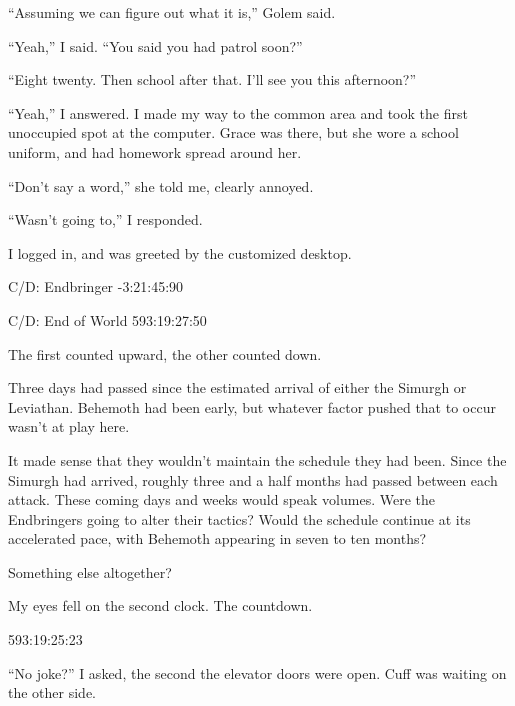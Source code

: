 ``Assuming we can figure out what it is,'' Golem said.



``Yeah,'' I said. ``You said you had patrol soon?''



``Eight twenty.  Then school after that.  I'll see you this afternoon?''



``Yeah,'' I answered.  I made my way to the common area and took the first unoccupied spot at the computer.  Grace was there, but she wore a school uniform, and had homework spread around her.



``Don't say a word,'' she told me, clearly annoyed.



``Wasn't going to,'' I responded.



I logged in, and was greeted by the customized desktop.



C/D: Endbringer
-3:21:45:90



C/D: End of World
593:19:27:50



The first counted upward, the other counted down.



Three days had passed since the estimated arrival of either the Simurgh or Leviathan.  Behemoth had been early, but whatever factor pushed that to occur wasn't at play here.



It made sense that they wouldn't maintain the schedule they had been.  Since the Simurgh had arrived, roughly three and a half months had passed between each attack.
These coming days and weeks would speak volumes.  Were the Endbringers going to alter their tactics?  Would the schedule continue at its accelerated pace, with Behemoth appearing in seven to ten months?



Something else altogether?



My eyes fell on the second clock.  The countdown.



593:19:25:23



\blacksquare



``No joke?'' I asked, the second the elevator doors were open.  Cuff was waiting on the other side.




